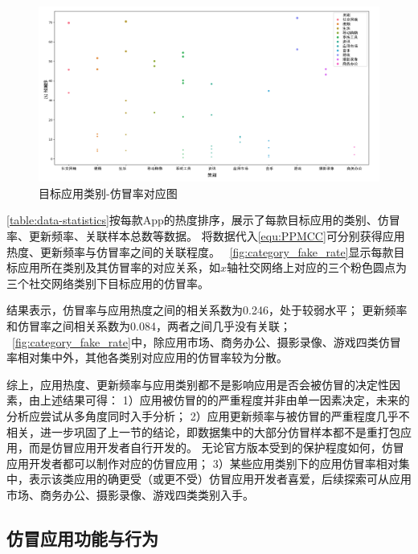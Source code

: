 \begin{figure}[htbp]
    \centering
    \setlength{\belowcaptionskip}{-10pt}
    \includegraphics[width=\textwidth]{./Figures/edwin-category-fake-rate.png}
    \caption{目标应用类别-仿冒率对应图}
    \label{fig:category_fake_rate}
\end{figure}

\autoref{table:data-statistics}按每款App的热度排序，展示了每款目标应用的类别、仿冒率、更新频率、关联样本总数等数据。
将数据代入\autoref{equ:PPMCC}可分别获得应用热度、更新频率与仿冒率之间的关联程度。
~\autoref{fig:category_fake_rate}显示每款目标应用所在类别及其仿冒率的对应关系，如$x$轴社交网络上对应的三个粉色圆点为三个社交网络类别下目标应用的仿冒率。

结果表示，仿冒率与应用热度之间的相关系数为0.246，处于较弱水平；
更新频率和仿冒率之间相关系数为0.084，两者之间几乎没有关联；
~\autoref{fig:category_fake_rate}中，除应用市场、商务办公、摄影录像、游戏四类仿冒率相对集中外，其他各类别对应应用的仿冒率较为分散。

综上，应用热度、更新频率与应用类别都不是影响应用是否会被仿冒的决定性因素，由上述结果可得：
1）应用被仿冒的的严重程度并非由单一因素决定，未来的分析应尝试从多角度同时入手分析；
2）应用更新频率与被仿冒的严重程度几乎不相关，进一步巩固了上一节的结论，即数据集中的大部分仿冒样本都不是重打包应用，而是仿冒应用开发者自行开发的。
无论官方版本受到的保护程度如何，仿冒应用开发者都可以制作对应的仿冒应用；
3）某些应用类别下的应用仿冒率相对集中，表示该类应用的确更受（或更不受）仿冒应用开发者喜爱，后续探索可从应用市场、商务办公、摄影录像、游戏四类类别入手。


\subsection{仿冒应用功能与行为}



